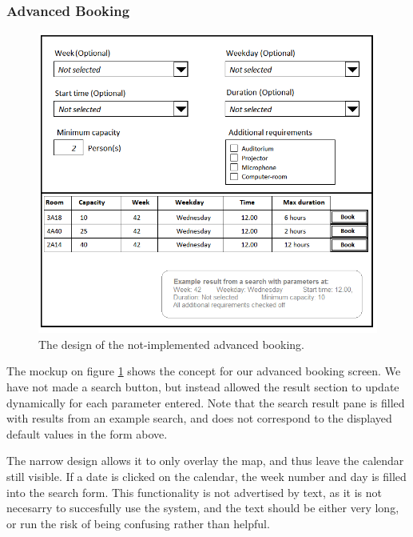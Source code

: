 \subsubsection*{Advanced Booking}
\begin{figure}[htb]
\begin{center}
\leavevmode
\includegraphics[width=1\textwidth]{images/screens/advanced_mockup}
\end{center}
\caption{The design of the not-implemented advanced booking.}
\label{fig:advanced_mockup}
\end{figure}
The mockup on figure \ref{fig:advanced_mockup} shows the concept for our advanced booking screen. We have not made a search button, but instead allowed the result section to update dynamically for each parameter entered.
Note that the search result pane is filled with results from an example search, and does not correspond to the displayed default values in the form above.

The narrow design allows it to only overlay the map, and thus leave the calendar still visible. 
If a date is clicked on the calendar, the week number and day is filled into the search form. This functionality is not advertised by text, as it is not necesarry to succesfully use the system, and the text should be either very long, or run the risk of being confusing rather than helpful.\cite{steve}

\pagebreak
